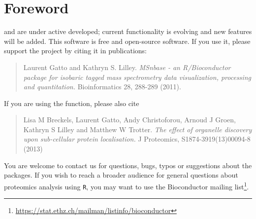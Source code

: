 \section*{Foreword}


 and  are under active developed; 
current functionality is evolving and new features will be added. 
This software is free and open-source software. 
If you use it, please support the project by citing it in publications:

\begin{quote}
  Laurent Gatto and Kathryn S. Lilley. \emph{MSnbase - an R/Bioconductor 
    package for isobaric tagged mass spectrometry data visualization,
    processing and quantitation.} Bioinformatics 28, 288-289 (2011).
\end{quote}

If you are using the  function, please also cite

\begin{quote}
  Lisa M Breckels, Laurent Gatto, Andy Christoforou, Arnoud J Groen, 
  Kathryn S Lilley and Matthew W Trotter. 
  \emph{The effect of organelle discovery upon sub-cellular protein localisation.} 
  J Proteomics, S1874-3919(13)00094-8 (2013)
\end{quote}

You are welcome to contact us for questions, bugs, typos or suggestions about the packages.
If you wish to reach a broader audience for general questions about proteomics analysis using 
\texttt{R}, you may want to use the Bioconductor mailing 
list\footnote{\url{https://stat.ethz.ch/mailman/listinfo/bioconductor}}.
